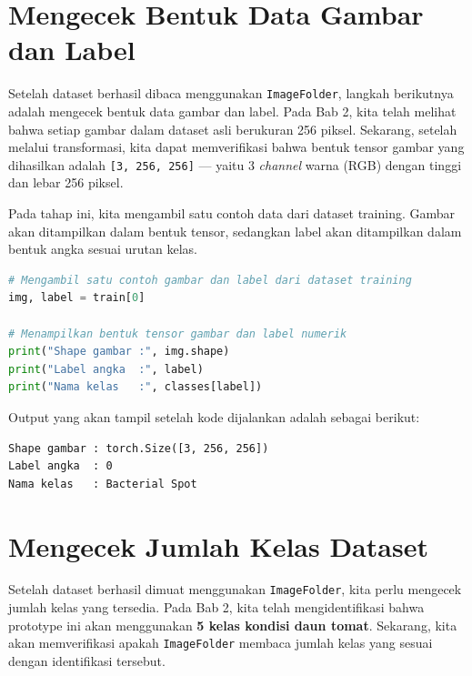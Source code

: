 \section{Mengecek Bentuk Data Gambar dan Label}

Setelah dataset berhasil dibaca menggunakan \texttt{ImageFolder}, langkah berikutnya adalah mengecek bentuk data gambar dan label. Pada Bab 2, kita telah melihat bahwa setiap gambar dalam dataset asli berukuran 256 piksel. Sekarang, setelah melalui transformasi, kita dapat memverifikasi bahwa bentuk tensor gambar yang dihasilkan adalah \texttt{[3, 256, 256]} --- yaitu 3 \textit{channel} warna (RGB) dengan tinggi dan lebar 256 piksel.

Pada tahap ini, kita mengambil satu contoh data dari dataset training. Gambar akan ditampilkan dalam bentuk tensor, sedangkan label akan ditampilkan dalam bentuk angka sesuai urutan kelas.

\begin{lstlisting}[language=Python, caption=Mengecek bentuk tensor gambar dan label]
# Mengambil satu contoh gambar dan label dari dataset training
img, label = train[0]

# Menampilkan bentuk tensor gambar dan label numerik
print("Shape gambar :", img.shape)
print("Label angka  :", label)
print("Nama kelas   :", classes[label])
\end{lstlisting}

Output yang akan tampil setelah kode dijalankan adalah sebagai berikut:

\begin{outputcode}[H]
\begin{lstlisting}[language={}]
Shape gambar : torch.Size([3, 256, 256])
Label angka  : 0
Nama kelas   : Bacterial Spot
\end{lstlisting}
\caption{Output pengecekan bentuk data}
\end{outputcode}

\section{Mengecek Jumlah Kelas Dataset}

Setelah dataset berhasil dimuat menggunakan \texttt{ImageFolder}, kita perlu mengecek jumlah kelas yang tersedia. Pada Bab 2, kita telah mengidentifikasi bahwa prototype ini akan menggunakan \textbf{5 kelas kondisi daun tomat}. Sekarang, kita akan memverifikasi apakah \texttt{ImageFolder} membaca jumlah kelas yang sesuai dengan identifikasi tersebut.

